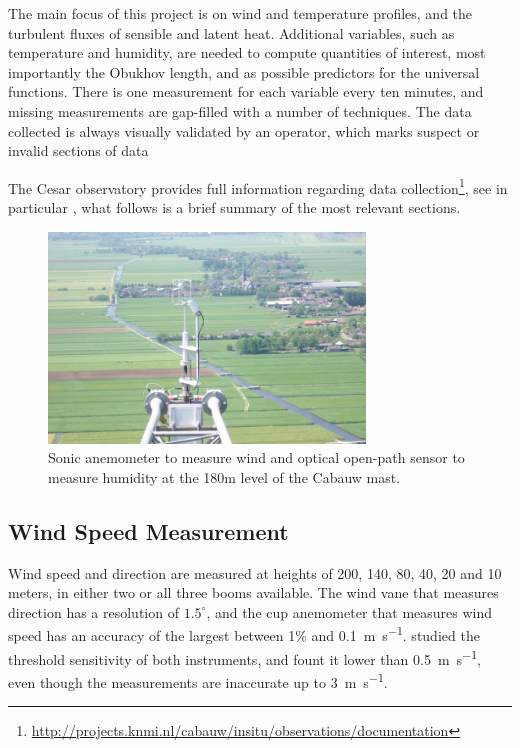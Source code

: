 \documentclass[12pt]{book}
\begin{document}
The main focus of this project is on wind and temperature profiles, and the turbulent fluxes of sensible and latent heat. Additional variables, such as temperature and humidity, are needed to compute quantities of interest, most importantly the Obukhov length, and as possible predictors for the universal functions. There is one measurement for each variable every ten minutes, and missing measurements are gap-filled with a number of techniques. The data collected is always visually validated by an operator, which marks suspect or invalid sections of data

The Cesar observatory provides full information regarding data collection\footnote{\url{http://projects.knmi.nl/cabauw/insitu/observations/documentation}}, see in particular \cite{cabauwinsitu}, what follows is a brief summary of the most relevant sections.

\begin{figure}
\caption{Sonic anemometer to measure wind and optical open-path sensor to measure humidity at the 180m level of the Cabauw mast.}
\label{fig:cabauw_180m_instruments}
\centering
\includegraphics[width=0.75\textwidth]{images/cabauw_turbulence_instruments}
\end{figure}

\subsection{Wind Speed Measurement}
Wind speed and direction are measured at heights of 200, 140, 80, 40, 20 and 10 meters, in either two or all three booms available. The wind vane that measures direction has a resolution of $1.5^\circ$, and the cup anemometer that measures wind speed has an accuracy of the largest between 1\% and \SI{0.1}{\meter\per\second}. \cite{windinstr} studied the threshold sensitivity of both instruments, and fount it lower than \SI{0.5}{\meter\per\second}, even though the measurements are inaccurate up to \SI{3}{\meter\per\second}.
\end{document}
